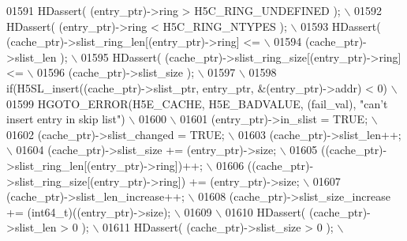 \begin{DoxyCode}
01591 \textcolor{preprocessor}{    HDassert( (entry\_ptr)->ring > H5C\_RING\_UNDEFINED );                        \(\backslash\)}
01592 \textcolor{preprocessor}{    HDassert( (entry\_ptr)->ring < H5C\_RING\_NTYPES );                           \(\backslash\)}
01593 \textcolor{preprocessor}{    HDassert( (cache\_ptr)->slist\_ring\_len[(entry\_ptr)->ring] <=                \(\backslash\)}
01594 \textcolor{preprocessor}{              (cache\_ptr)->slist\_len );                                        \(\backslash\)}
01595 \textcolor{preprocessor}{    HDassert( (cache\_ptr)->slist\_ring\_size[(entry\_ptr)->ring] <=               \(\backslash\)}
01596 \textcolor{preprocessor}{              (cache\_ptr)->slist\_size );                                       \(\backslash\)}
01597 \textcolor{preprocessor}{                                                                               \(\backslash\)}
01598 \textcolor{preprocessor}{    if(H5SL\_insert((cache\_ptr)->slist\_ptr, entry\_ptr, &(entry\_ptr)->addr) < 0) \(\backslash\)}
01599 \textcolor{preprocessor}{        HGOTO\_ERROR(H5E\_CACHE, H5E\_BADVALUE, (fail\_val), "can't insert entry in skip list") \(\backslash\)}
01600 \textcolor{preprocessor}{                                                                               \(\backslash\)}
01601 \textcolor{preprocessor}{    (entry\_ptr)->in\_slist = TRUE;                                              \(\backslash\)}
01602 \textcolor{preprocessor}{    (cache\_ptr)->slist\_changed = TRUE;                                         \(\backslash\)}
01603 \textcolor{preprocessor}{    (cache\_ptr)->slist\_len++;                                                  \(\backslash\)}
01604 \textcolor{preprocessor}{    (cache\_ptr)->slist\_size += (entry\_ptr)->size;                              \(\backslash\)}
01605 \textcolor{preprocessor}{    ((cache\_ptr)->slist\_ring\_len[(entry\_ptr)->ring])++;                        \(\backslash\)}
01606 \textcolor{preprocessor}{    ((cache\_ptr)->slist\_ring\_size[(entry\_ptr)->ring]) += (entry\_ptr)->size;    \(\backslash\)}
01607 \textcolor{preprocessor}{    (cache\_ptr)->slist\_len\_increase++;                                         \(\backslash\)}
01608 \textcolor{preprocessor}{    (cache\_ptr)->slist\_size\_increase += (int64\_t)((entry\_ptr)->size);          \(\backslash\)}
01609 \textcolor{preprocessor}{                                                                               \(\backslash\)}
01610 \textcolor{preprocessor}{    HDassert( (cache\_ptr)->slist\_len > 0 );                                    \(\backslash\)}
01611 \textcolor{preprocessor}{    HDassert( (cache\_ptr)->slist\_size > 0 );                                   \(\backslash\)}

\end{DoxyCode}
